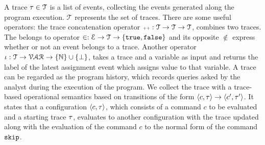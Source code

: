 A trace $\mathtt{\tau} \in \mathcal{T} $ is a list of events, 
collecting the events generated along the program execution. $\mathcal{T} $ represents the set of traces. There are some useful operators: the trace concatenation operator ${\scriptscriptstyle ++}: \mathcal{T} \to \mathcal{T} \to \mathcal{T}$, combines two traces.
The belongs to operator $\in : \mathcal{E} \to \mathcal{T} \to \{\mathtt{true}, \mathtt{false} \} $ and its opposite $\not\in$
express whether or not an event belongs to a trace.
Another operator $\iota : \mathcal{T} \to \mathcal{VAR} \to \{\mathbb{N}\}\cup \{\bot\}$,
takes a trace and a variable as input and returns the label of the latest assignment event which assigns value to that variable. 
%
A trace can be regarded as the program history, which records queries asked by the analyst during the execution of the program. We collect the trace with a trace-based operational semantics based on transitions of the form $ \langle c, \mathtt{\tau} \rangle \to \langle c', \mathtt{\tau}' \rangle $. It states that a configuration $\langle c, \mathtt{\tau} \rangle$, which consists of a command $c$ to be evaluated and a starting trace $\mathtt{\tau}$, evaluates to another configuration with the trace updated along with the evaluation of the command $c$ to the normal form of the command $\mathtt{skip}$.
